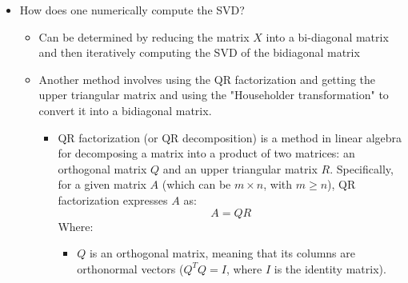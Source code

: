 \documentclass[11.5pt,a4paper]{article}
\begin{document}
\begin{itemize}
\begin{itemize}
\begin{equation*}
        \end{equation*}
        Where columns of $\hat U^\perp$ spans a vector space that is complementary and orthogonal to $\hat U$. In the economy SVD, this complementary vector ($\hat U^\perp$) it is associated with singular values equal to 0. As a result, the following equation is derived:
        \begin{equation*}
            X = \hat U\hat \Sigma V^*
        \end{equation*}
        \textit{The above equation is under the assumption that $n \geq m$ for $X \in \mathbb{C}^{n\time m}$}
    \end{itemize}
    \item How does one numerically compute the SVD?
    \begin{itemize}
        \item Can be determined by reducing the matrix $X$ into a bi-diagonal matrix and then iteratively computing the SVD of the bidiagonal matrix
        \item Another method involves using the QR factorization and getting the upper triangular matrix and using the "Householder transformation" to convert it into a bidiagonal matrix.
        \begin{itemize}
            \item QR factorization (or QR decomposition) is a method in linear algebra for decomposing a matrix into a product of two matrices: an orthogonal matrix \( Q \) and an upper triangular matrix \( R \). Specifically, for a given matrix \( A \) (which can be \( m \times n \), with \( m \geq n \)), QR factorization expresses \( A \) as: \[ A = Q R \] Where: 
            \begin{itemize}
                \item \( Q \) is an orthogonal matrix, meaning that its columns are orthonormal vectors (\( Q^T Q = I \), where \( I \) is the identity matrix).


\end{itemize}
\end{itemize}
\end{itemize}
\end{itemize}
\end{document}
